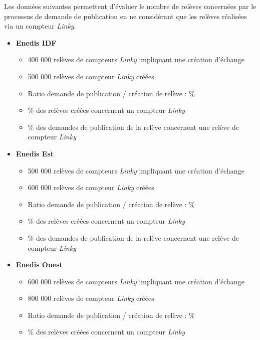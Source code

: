 \documentclass[a4paper, 12pt]{report}
\begin{document}
Les données suivantes permettent d’évaluer le nombre de relèves concernées par le processus de demande de publication en ne considérant que les relèves réalisées via un compteur \textit{\textit{Linky}}.\\

\begin{itemize}
  \item \textbf{Enedis IDF}
  \begin{itemize}
    \item \approx{} 400 000 relèves de compteurs \textit{\textit{Linky}} impliquant une création d'échange
    \item \approx{} 500 000 relèves de compteur \textit{\textit{Linky}} créées
    \item Ratio demande de publication / création de relève : \approx{}\%
    \item \approx{}\% des relèves créées concernent un compteur \textit{\textit{Linky}}
    \item \approx{}\% des demandes de publication de la relève concernent une relève de compteur \textit{\textit{Linky}}
  \end{itemize}
  \item \textbf{Enedis Est}
  \begin{itemize}
    \item \approx{} 500 000 relèves de compteurs \textit{Linky} impliquant une création d'échange
    \item \approx{} 600 000 relèves de compteur \textit{Linky} créées
    \item Ratio demande de publication / création de relève : \approx{}\%
    \item \approx{}\% des relèves créées concernent un compteur \textit{Linky}
    \item \approx{}\% des demandes de publication de la relève concernent une relève de compteur \textit{Linky}
  \end{itemize}
  \item \textbf{Enedis Ouest}
  \begin{itemize}
    \item \approx{} 600 000 relèves de compteurs \textit{Linky} impliquant une création d'échange
    \item \approx{} 800 000 relèves de compteur \textit{Linky} créées
    \item Ratio demande de publication / création de relève : \approx{}\%
    \item \approx{}\% des relèves créées concernent un compteur \textit{Linky}

\end{itemize}
\end{itemize}
\end{document}
